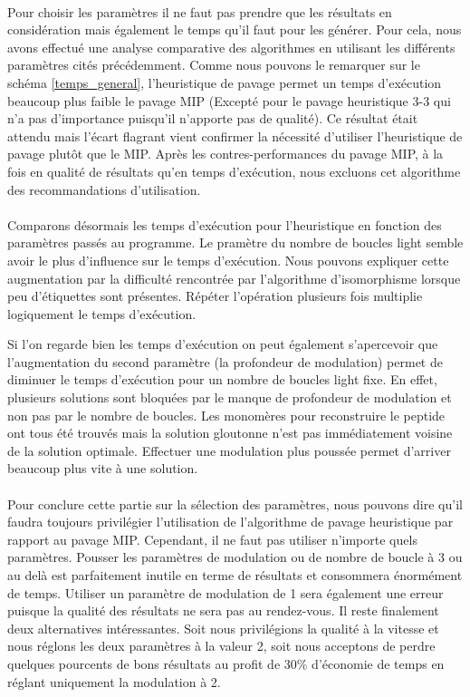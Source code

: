\documentclass[12pt,french,twoside]{report}
\begin{document}
\paragraph{}Pour choisir les paramètres il ne faut pas prendre que les résultats en considération mais également le temps qu'il faut pour les générer.
Pour cela, nous avons effectué une analyse comparative des algorithmes en utilisant les différents paramètres cités précédemment.
Comme nous pouvons le remarquer sur le schéma \ref{temps_general}, l'heuristique de pavage permet un temps d'exécution beaucoup plus faible le pavage MIP (Excepté pour le pavage heuristique 3-3 qui n'a pas d'importance puisqu'il n'apporte pas de qualité).
Ce résultat était attendu mais l'écart flagrant vient confirmer la nécessité d'utiliser l'heuristique de pavage plutôt que le MIP.
Après les contres-performances du pavage MIP, à la fois en qualité de résultats qu'en temps d'exécution, nous excluons cet algorithme des recommandations d'utilisation.

\paragraph{}Comparons désormais les temps d'exécution pour l'heuristique en fonction des paramètres passés au programme.
Le pramètre du nombre de boucles light semble avoir le plus d'influence sur le temps d'exécution.
Nous pouvons expliquer cette augmentation par la difficulté rencontrée par l'algorithme d'isomorphisme lorsque peu d'étiquettes sont présentes.
Répéter l'opération plusieurs fois multiplie logiquement le temps d'exécution.

Si l'on regarde bien les temps d'exécution on peut également s'apercevoir que l'augmentation du second paramètre (la profondeur de modulation) permet de diminuer le temps d'exécution pour un nombre de boucles light fixe.
En effet, plusieurs solutions sont bloquées par le manque de profondeur de modulation et non pas par le nombre de boucles.
Les monomères pour reconstruire le peptide ont tous été trouvés mais la solution gloutonne n'est pas immédiatement voisine de la solution optimale.
Effectuer une modulation plus poussée permet d'arriver beaucoup plus vite à une solution.

\paragraph{}Pour conclure cette partie  sur la sélection des paramètres, nous pouvons dire qu'il faudra toujours privilégier l'utilisation de l'algorithme de pavage heuristique par rapport au pavage MIP.
Cependant, il ne faut pas utiliser n'importe quels paramètres.
Pousser les paramètres de modulation ou de nombre de boucle à 3 ou au delà est parfaitement inutile en terme de résultats et consommera énormément de temps.
Utiliser un paramètre de modulation de 1 sera également une erreur puisque la qualité des résultats ne sera pas au rendez-vous.
Il reste finalement deux alternatives intéressantes.
Soit nous privilégions la qualité à la vitesse et nous réglons les deux paramètres à la valeur 2, soit nous acceptons de perdre quelques pourcents de bons résultats au profit de 30\% d'économie de temps en réglant uniquement la modulation à 2.
\end{document}
